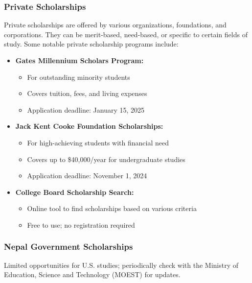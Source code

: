 \subsubsection{Private Scholarships}
Private scholarships are offered by various organizations, foundations, and corporations. They can be merit-based, need-based, or specific to certain fields of study. Some notable private scholarship programs include:
\begin{itemize}
    \item \textbf{Gates Millennium Scholars Program:}
    \begin{itemize}
        \item For outstanding minority students
        \item Covers tuition, fees, and living expenses
        \item Application deadline: January 15, 2025
    \end{itemize}

    \item \textbf{Jack Kent Cooke Foundation Scholarships:}
    \begin{itemize}
        \item For high-achieving students with financial need
        \item Covers up to \$40,000/year for undergraduate studies
        \item Application deadline: November 1, 2024
    \end{itemize}

    \item \textbf{College Board Scholarship Search:}
    \begin{itemize}
        \item Online tool to find scholarships based on various criteria
        \item Free to use; no registration required
    \end{itemize}
\end{itemize}

\subsubsection{Nepal Government Scholarships}
Limited opportunities for U.S. studies; periodically check with the Ministry of Education, Science and Technology (MOEST) for updates.

